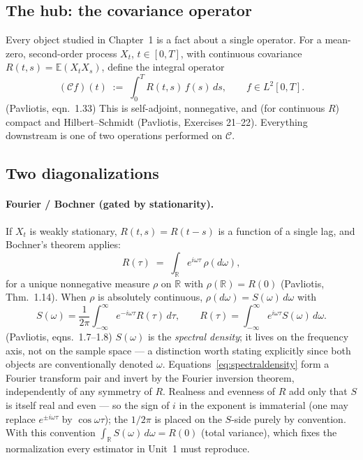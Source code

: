 \documentclass[11pt]{article}
\newcommand{\pav}[1]{{\small\color{hubblue}(Pavliotis, #1)}}
\begin{document}
\subsection{The hub: the covariance operator}

Every object studied in Chapter~1 is a fact about a single operator. For a mean-zero, second-order process $X_t$, $t\in[0,T]$, with continuous covariance $R(t,s) = \mathbb{E}(X_tX_s)$, define the integral operator
\begin{equation}
(\mathcal{C}f)(t) \;:=\; \int_0^T R(t,s)\,f(s)\,ds, \qquad f \in L^2[0,T].
\label{eq:covop}
\end{equation}
\pav{eqn.~1.33} This is self-adjoint, nonnegative, and (for continuous $R$) compact and Hilbert--Schmidt \pav{Exercises 21--22}. Everything downstream is one of two operations performed on $\mathcal{C}$.

\subsection{Two diagonalizations}

\paragraph{Fourier / Bochner (gated by stationarity).}
If $X_t$ is weakly stationary, $R(t,s) = R(t-s)$ is a function of a single lag, and Bochner's theorem applies:
\begin{equation}
R(\tau) \;=\; \int_{\mathbb{R}} e^{i\omega\tau}\,\rho(d\omega),
\label{eq:bochner}
\end{equation}
for a unique nonnegative measure $\rho$ on $\mathbb{R}$ with $\rho(\mathbb{R}) = R(0)$ \pav{Thm.~1.14}. When $\rho$ is absolutely continuous, $\rho(d\omega) = S(\omega)\,d\omega$ with
\begin{equation}
S(\omega) = \frac{1}{2\pi}\int_{-\infty}^{\infty} e^{-i\omega\tau}R(\tau)\,d\tau,
\qquad
R(\tau) = \int_{-\infty}^{\infty} e^{i\omega\tau}S(\omega)\,d\omega.
\label{eq:spectraldensity}
\end{equation}
\pav{eqns.~1.7--1.8} $S(\omega)$ is the \emph{spectral density}; it lives on the frequency axis, not on the sample space --- a distinction worth stating explicitly since both objects are conventionally denoted $\omega$. Equations~\eqref{eq:spectraldensity} form a Fourier transform pair and invert by the Fourier inversion theorem, independently of any symmetry of $R$. Realness and evenness of $R$ add only that $S$ is itself real and even --- so the sign of $i$ in the exponent is immaterial (one may replace $e^{\pm i\omega\tau}$ by $\cos\omega\tau$); the $1/2\pi$ is placed on the $S$-side purely by convention. With this convention $\int_{\mathbb{R}} S(\omega)\,d\omega = R(0)$ (total variance), which fixes the normalization every estimator in Unit~1 must reproduce.
\end{document}
